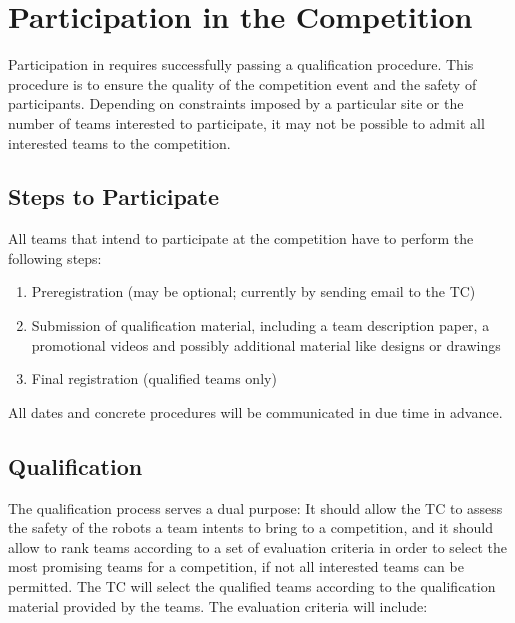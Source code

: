 \section{Participation in the Competition}\label{sec:participation_in_the_competition}
Participation in \RCAW requires successfully passing a qualification procedure. This procedure is to ensure the quality of the competition event and the safety of participants. Depending on constraints imposed by a particular site or the number of teams interested to participate, it may not be possible to admit all interested teams to the competition.
 

\subsection{Steps to Participate}
All teams that intend to participate at the competition have to perform the following steps:

\begin{enumerate}
	\item Preregistration (may be optional; currently by sending email to the TC)
	\item Submission of qualification material, including a team description paper, a promotional videos and possibly additional material like designs or drawings
	\item Final registration (qualified teams only)
\end{enumerate}


All dates and concrete procedures will be communicated in due time in advance.

\subsection{Qualification}
The qualification process serves a dual purpose: It should allow the TC to assess the safety of the robots a team intents to bring to a competition, and it should allow to rank teams according to a set of evaluation criteria in order to select the most promising teams for a competition, if not all interested teams can be permitted. The TC will select the qualified teams according to the qualification material provided by the teams. The evaluation criteria will include:

